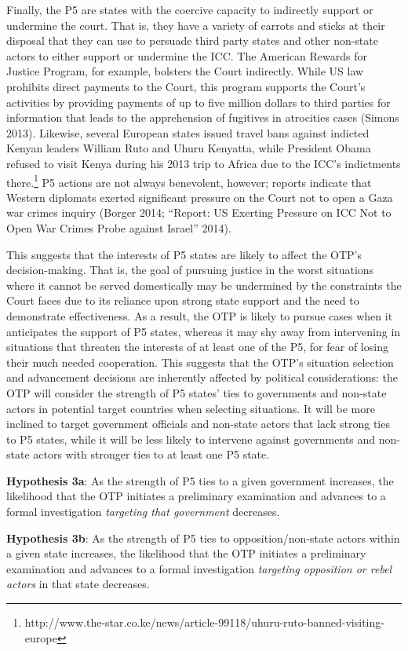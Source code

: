 Finally, the P5 are states with the coercive capacity to indirectly support or undermine the court. That is, they have a variety of carrots and sticks at their disposal that they can use to persuade third party states and other non-state actors to either support or undermine the ICC. The American Rewards for Justice Program, for example, bolsters the Court indirectly. While US law prohibits direct payments to the Court, this program supports the Court's activities by providing payments of up to five million dollars to third parties for information that leads to the apprehension of fugitives in atrocities cases (Simons 2013). Likewise, several European states issued travel bans against indicted Kenyan leaders William Ruto and Uhuru Kenyatta, while President Obama refused to visit Kenya during his 2013 trip to Africa due to the ICC's indictments there.\footnote{http://www.the-star.co.ke/news/article-99118/uhuru-ruto-banned-visiting-europe} P5 actions are not always benevolent, however; reports indicate that Western diplomats exerted significant pressure on the Court not to open a Gaza war crimes inquiry (Borger 2014; ``Report: US Exerting Pressure on ICC Not to Open War Crimes Probe against Israel'' 2014).

This suggests that the interests of P5 states are likely to affect the OTP's decision-making. That is, the goal of pursuing justice in the worst situations where it cannot be served domestically may be undermined by the constraints the Court faces due to its reliance upon strong state support and the need to demonstrate effectiveness. As a result, the OTP is likely to pursue cases when it anticipates the support of P5 states, whereas it may shy away from intervening in situations that threaten the interests of at least one of the P5, for fear of losing their much needed cooperation. This suggests that the OTP's situation selection and advancement decisions are inherently affected by political considerations: the OTP will consider the strength of P5 states' ties to governments and non-state actors in potential target countries when selecting situations. It will be more inclined to target government officials and non-state actors that lack strong ties to P5 states, while it will be less likely to intervene against governments and non-state actors with stronger ties to at least one P5 state.

\textbf{Hypothesis 3a}: As the strength of P5 ties to a given government increases, the likelihood that the OTP initiates a preliminary examination and advances to a formal investigation \emph{targeting that government} decreases.

\textbf{Hypothesis 3b}: As the strength of P5 ties to opposition/non-state actors within a given state increases, the likelihood that the OTP initiates a preliminary examination and advances to a formal investigation \emph{targeting opposition or rebel actors} in that state decreases.
